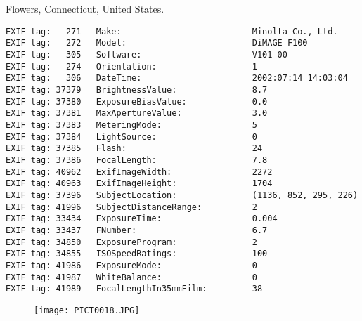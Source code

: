 \section{\protect{}}
\noindent Flowers, Connecticut, United States.
\noindent
\begin{lstlisting}
EXIF tag:   271   Make:                          Minolta Co., Ltd.
EXIF tag:   272   Model:                         DiMAGE F100
EXIF tag:   305   Software:                      V101-00
EXIF tag:   274   Orientation:                   1
EXIF tag:   306   DateTime:                      2002:07:14 14:03:04
EXIF tag: 37379   BrightnessValue:               8.7
EXIF tag: 37380   ExposureBiasValue:             0.0
EXIF tag: 37381   MaxApertureValue:              3.0
EXIF tag: 37383   MeteringMode:                  5
EXIF tag: 37384   LightSource:                   0
EXIF tag: 37385   Flash:                         24
EXIF tag: 37386   FocalLength:                   7.8
EXIF tag: 40962   ExifImageWidth:                2272
EXIF tag: 40963   ExifImageHeight:               1704
EXIF tag: 37396   SubjectLocation:               (1136, 852, 295, 226)
EXIF tag: 41996   SubjectDistanceRange:          2
EXIF tag: 33434   ExposureTime:                  0.004
EXIF tag: 33437   FNumber:                       6.7
EXIF tag: 34850   ExposureProgram:               2
EXIF tag: 34855   ISOSpeedRatings:               100
EXIF tag: 41986   ExposureMode:                  0
EXIF tag: 41987   WhiteBalance:                  0
EXIF tag: 41989   FocalLengthIn35mmFilm:         38

\end{lstlisting}
\clearpage
\begin{figure}
\raggedleft
\texttt{[image: PICT0018.JPG]}
\end{figure}


\clearpage
